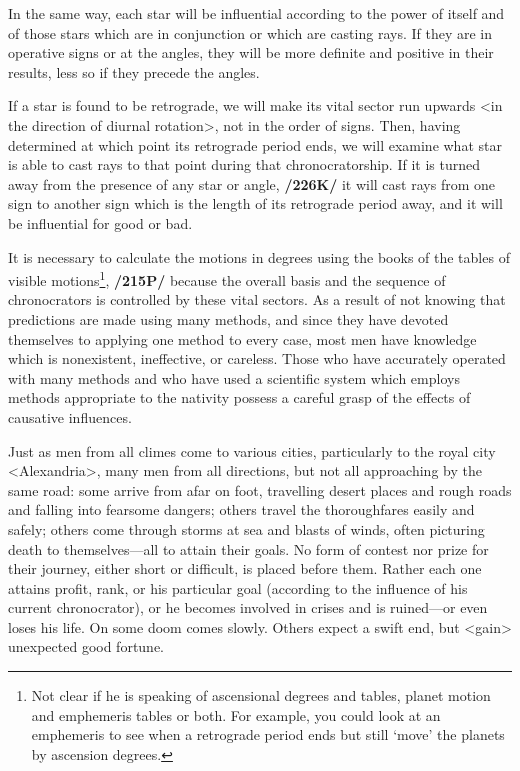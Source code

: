 In the same way, each star will be influential according to the power of itself and of those stars which are in conjunction or which are casting rays. If they are in operative signs or at the angles, they will be more definite and positive in their results, less so if they precede the angles. 

If a star is found to be  retrograde, we will make its vital sector run upwards <in the direction of diurnal rotation>, not in the order of signs. Then, having determined at which point its retrograde period ends, we will examine what star is able to cast rays to that point during that chronocratorship. If it is turned away from the presence of any star or angle, \textbf{/226K/} it will cast rays from one sign to another sign which is the length of its retrograde period away, and it will be influential for good or bad.

It is necessary to calculate the motions in degrees using the books of the tables of visible motions\footnote{Not clear if he is speaking of ascensional degrees and tables, planet motion and emphemeris tables or both. For example, you could look at an emphemeris to see when a retrograde period ends but still `move' the planets by ascension degrees.}, \textbf{/215P/} because the overall basis and the sequence of chronocrators is controlled by these vital sectors. As a result of not knowing that predictions are made using many methods, and since they have devoted themselves to applying one method to every case, most men have knowledge which is nonexistent, ineffective, or careless. Those who have accurately operated with many methods and who have used a scientific system which employs methods appropriate to the nativity possess a careful grasp of the effects of causative influences. 

Just as men from all climes come to various cities, particularly to the royal city <Alexandria>, many men from all directions, but not all approaching by the same road: some arrive from afar on foot, travelling desert places and rough roads and falling into fearsome dangers; others travel the thoroughfares easily and safely; others come through storms at sea and blasts of winds, often picturing death
to themselves—all to attain their goals. No form of contest nor prize for their journey, either short or difficult, is placed before them. Rather each one attains profit, rank, or his particular goal (according to the
influence of his current chronocrator), or he becomes involved in crises and is ruined—or even loses his life. On some doom comes slowly. Others expect a swift end, but <gain> unexpected good fortune. 

